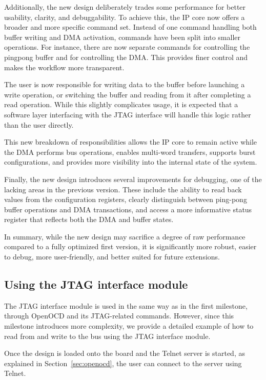 \documentclass[a4paper,11pt,oneside]{report}
\begin{document}
Additionally, the new design deliberately trades some performance for better usability, clarity, and debuggability.  
To achieve this, the IP core now offers a broader and more specific command set.  
Instead of one command handling both buffer writing and DMA activation, commands have been split into smaller operations.  
For instance, there are now separate commands for controlling the pingpong buffer and for controlling the DMA.  
This provides finer control and makes the workflow more transparent.

The user is now responsible for writing data to the buffer before launching a write operation,  
or switching the buffer and reading from it after completing a read operation.  
While this slightly complicates usage, it is expected that a software layer interfacing with the JTAG interface will handle this logic rather than the user directly.

This new breakdown of responsibilities allows the IP core to remain active while the DMA performs bus operations,  
enables multi-word transfers, supports burst configurations, and provides more visibility into the internal state of the system.

Finally, the new design introduces several improvements for debugging, one of the lacking areas in the previous version.  
These include the ability to read back values from the configuration registers,  
clearly distinguish between ping-pong buffer operations and DMA transactions,  
and access a more informative status register that reflects both the DMA and buffer states.

In summary, while the new design may sacrifice a degree of raw performance compared to a fully optimized first version,  
it is significantly more robust, easier to debug, more user-friendly, and better suited for future extensions.

\subsection{Using the JTAG interface module}

The JTAG interface module is used in the same way as in the first milestone, through OpenOCD and its JTAG-related commands.  
However, since this milestone introduces more complexity, we provide a detailed example of how to read from and write to the bus using the JTAG interface module.

Once the design is loaded onto the board and the Telnet server is started, as explained in Section~\ref{sec:openocd}, the user can connect to the server using Telnet.
\end{document}
